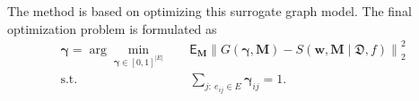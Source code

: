 The method is based on optimizing this surrogate graph model. The final optimization problem is formulated as
\begin{equation}
\begin{aligned}
\boldsymbol{\gamma}
=
\arg\min_{\boldsymbol{\gamma} \in [0,1]^{|E|}}
\quad
& \mathsf{E}_{\mathbf{M}}
\left\|
G(\boldsymbol{\gamma}, \mathbf{M})
-
S(\mathbf{w}, \mathbf{M} \mid \mathfrak{D}, f)
\right\|_2^2
\\
\textrm{s.t.} \quad
&
\sum_{j:\ e_{ij} \in E} \boldsymbol{\gamma}_{ij} = 1.
\end{aligned}
\end{equation}